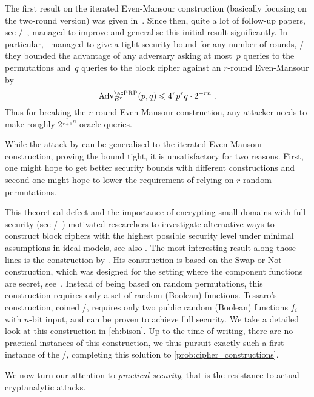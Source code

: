 The first result on the iterated Even-Mansour construction (basically focusing on the two-round version) was given in~\cite{EC:BKLSST12}.
Since then, quite a lot of follow-up papers, see \eg/~, managed to improve and generalise this initial result significantly.
In particular,~\cite{C:HoaTes16} managed to give a tight security bound for any number of rounds, \ie/ they bounded the advantage of any adversary asking at most~$p$ queries to the permutations and~$q$ queries to the block cipher against an $r$-round Even-Mansour by
\begin{equation*}
    \mathrm{Adv}^{\text{\PRP/}}_{E^r}(p,q) \leqslant {4^rp^rq} \cdot {2^{-rn}}\;.
\end{equation*}
Thus for breaking the $r$-round Even-Mansour construction, any attacker needs to make roughly $2^{\frac{r}{r+1}n}$ oracle queries.

While the attack by \textcite{AC:Daemen91} can be generalised to the iterated Even-Mansour construction, proving the bound tight, it is unsatisfactory for two reasons.
First, one might hope to get better security bounds with different constructions and second one might hope to lower the requirement of relying on $r$ random permutations.

This theoretical defect and the importance of encrypting small domains with full security (see \eg/~\cite{AC:MirYil17}) motivated researchers to investigate alternative ways to construct block ciphers with the highest possible security level under minimal assumptions in ideal models, see also .
The most interesting result along those lines is the construction by \textcite{AC:Tessaro15}.
His construction is based on the Swap-or-Not construction, which was designed for the setting where the component functions are secret, see~\cite{C:HoaMorRog12}.
Instead of being based on random permutations, this construction requires only a set of random (Boolean) functions.
Tessaro's construction, coined \WSNf/, requires only two public random (Boolean) functions $f_i$ with $n$-bit input, and can be proven to achieve full security.
We take a detailed look at this construction in \cref{ch:bison}.
Up to the time of writing, there are no practical instances of this construction, we thus pursuit exactly such a first instance of the \WSN/, completing this solution to \cref{prob:cipher_constructions}.

We now turn our attention to \emph{practical security}, that is the resistance to actual cryptanalytic attacks.

